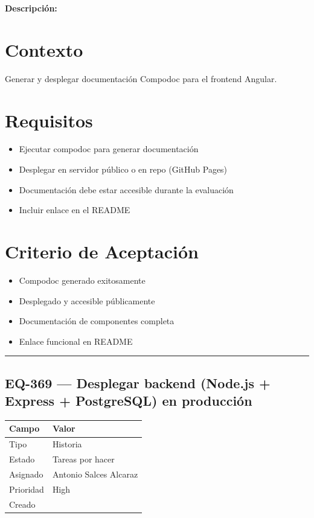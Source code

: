 \documentclass[
  spanish,
  11pt,
]{report}
\newcounter{none} %
\providecommand{\tightlist}{%
  \setlength{\itemsep}{0pt}\setlength{\parskip}{0pt}}
\begin{document}
\textbf{Descripción:}

\section{Contexto}\label{contexto-6}

Generar y desplegar documentación Compodoc para el frontend Angular.

\section{Requisitos}\label{requisitos-5}

\begin{itemize}
\tightlist
\item
  Ejecutar compodoc para generar documentación
\item
  Desplegar en servidor público o en repo (GitHub Pages)
\item
  Documentación debe estar accesible durante la evaluación
\item
  Incluir enlace en el README
\end{itemize}

\section{Criterio de Aceptación}\label{criterio-de-aceptaciuxf3n-5}

\begin{itemize}
\tightlist
\item[$\square$]
  Compodoc generado exitosamente
\item[$\square$]
  Desplegado y accesible públicamente
\item[$\square$]
  Documentación de componentes completa
\item[$\square$]
  Enlace funcional en README
\end{itemize}

\begin{center}\rule{0.5\linewidth}{0.5pt}\end{center}

\subsection{EQ-369 --- Desplegar backend (Node.js + Express +
PostgreSQL) en
producción}\label{eq-369-desplegar-backend-node.js-express-postgresql-en-producciuxf3n}

{\def\LTcaptype{none} %
\begin{longtable}[]{@{}ll@{}}
\toprule\noalign{}
Campo & Valor \\
\midrule\noalign{}
\endhead
\bottomrule\noalign{}
\endlastfoot
Tipo & Historia \\
Estado & Tareas por hacer \\
Asignado & Antonio Salces Alcaraz \\
Prioridad & High \\
Creado & \\
\end{longtable}
}
\end{document}
